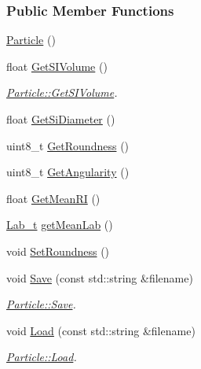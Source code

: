 \subsubsection*{Public Member Functions}
\begin{DoxyCompactItemize}
\item 
\hyperlink{class_soil_analyzer_1_1_particle_ac01adbc5a4a30350985c0076da52e7da}{Particle} ()
\item 
float \hyperlink{class_soil_analyzer_1_1_particle_af68a5033f943ad4bb4937a19b49a2a62}{Get\+S\+I\+Volume} ()
\begin{DoxyCompactList}\small\item\em \hyperlink{class_soil_analyzer_1_1_particle_af68a5033f943ad4bb4937a19b49a2a62}{Particle\+::\+Get\+S\+I\+Volume}. \end{DoxyCompactList}\item 
float \hyperlink{class_soil_analyzer_1_1_particle_aacde58abc866af8873c73044db80820b}{Get\+Si\+Diameter} ()
\item 
uint8\+\_\+t \hyperlink{class_soil_analyzer_1_1_particle_ad603f101f2ef70d0f88e705cbff931ca}{Get\+Roundness} ()
\item 
uint8\+\_\+t \hyperlink{class_soil_analyzer_1_1_particle_ac72bceb44e7fad2ac4afa20659d2c6ca}{Get\+Angularity} ()
\item 
float \hyperlink{class_soil_analyzer_1_1_particle_a6f4be224d548751438b47c955e0f33e2}{Get\+Mean\+R\+I} ()
\item 
\hyperlink{struct_soil_analyzer_1_1_lab__t}{Lab\+\_\+t} \hyperlink{class_soil_analyzer_1_1_particle_afb8b72485e4f40a8d41ae8c2d1676c0e}{get\+Mean\+Lab} ()
\item 
void \hyperlink{class_soil_analyzer_1_1_particle_a52c104046f8cc25940ae26a84c91a62c}{Set\+Roundness} ()
\item 
void \hyperlink{class_soil_analyzer_1_1_particle_a2fda22dab684cd30622dd30123b9acae}{Save} (const std\+::string \&filename)
\begin{DoxyCompactList}\small\item\em \hyperlink{class_soil_analyzer_1_1_particle_a2fda22dab684cd30622dd30123b9acae}{Particle\+::\+Save}. \end{DoxyCompactList}\item 
void \hyperlink{class_soil_analyzer_1_1_particle_a555bb4744ce9579c4b67878b6c3d70f7}{Load} (const std\+::string \&filename)
\begin{DoxyCompactList}\small\item\em \hyperlink{class_soil_analyzer_1_1_particle_a555bb4744ce9579c4b67878b6c3d70f7}{Particle\+::\+Load}. \end{DoxyCompactList}\end{DoxyCompactItemize}
